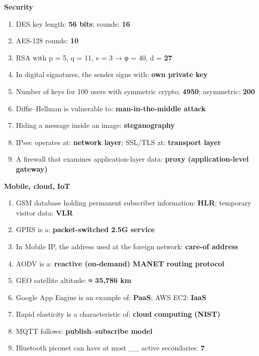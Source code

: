 \textbf{Security}

\begin{enumerate}
\def\labelenumi{\arabic{enumi}.}
\setcounter{enumi}{50}
\tightlist
\item
  DES key length: \textbf{56 bits}; rounds: \textbf{16}
\item
  AES-128 rounds: \textbf{10}
\item
  RSA with p = 5, q = 11, e = 3 → φ = 40, d = \textbf{27}
\item
  In digital signatures, the sender signs with: \textbf{own private key}
\item
  Number of keys for 100 users with symmetric crypto: \textbf{4950}; asymmetric: \textbf{200}
\item
  Diffie--Hellman is vulnerable to: \textbf{man-in-the-middle attack}
\item
  Hiding a message inside an image: \textbf{steganography}
\item
  IPsec operates at: \textbf{network layer}; SSL/TLS at: \textbf{transport layer}
\item
  A firewall that examines application-layer data: \textbf{proxy (application-level gateway)}
\end{enumerate}

\textbf{Mobile, cloud, IoT}

\begin{enumerate}
\def\labelenumi{\arabic{enumi}.}
\setcounter{enumi}{59}
\tightlist
\item
  GSM database holding permanent subscriber information: \textbf{HLR}; temporary visitor data: \textbf{VLR}
\item
  GPRS is a: \textbf{packet-switched 2.5G service}
\item
  In Mobile IP, the address used at the foreign network: \textbf{care-of address}
\item
  AODV is a: \textbf{reactive (on-demand) MANET routing protocol}
\item
  GEO satellite altitude: \textbf{≈ 35,786 km}
\item
  Google App Engine is an example of: \textbf{PaaS}; AWS EC2: \textbf{IaaS}
\item
  Rapid elasticity is a characteristic of: \textbf{cloud computing (NIST)}
\item
  MQTT follows: \textbf{publish--subscribe model}
\item
  Bluetooth piconet can have at most \_\_ active secondaries: \textbf{7}
\end{enumerate}


